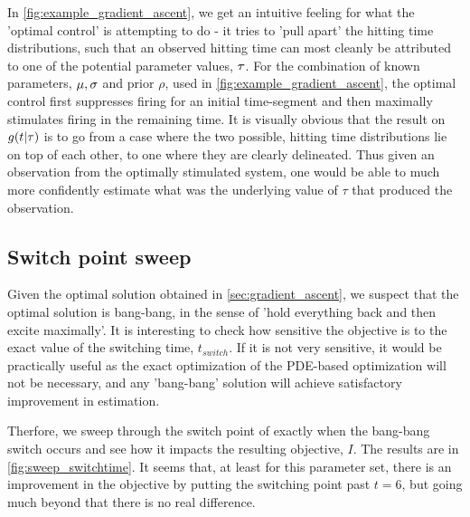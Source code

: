 In \cref{fig:example_gradient_ascent}, we get an intuitive 
feeling for what the 'optimal control' is attempting to do - it tries to
'pull apart' the hitting time distributions, such that an observed hitting time
can most cleanly be attributed to one of the potential parameter values, ${\tau}$.
For the combination of known parameters, ${\mu }, \sigma$ and prior $\rho$, used in
\cref{fig:example_gradient_ascent}, the optimal control first suppresses firing
for an initial time-segment and then maximally stimulates firing in the
remaining time. 
It is visually obvious that the result on $g(t|{ \tau })$ is to go
from a case where the two possible, hitting time distributions lie on top of each other, to one where they are clearly
delineated. Thus given an observation from the optimally stimulated system, one
would be able to much more confidently estimate what was the underlying value of
$\tau$ that produced the observation. 

\subsection{Switch point sweep}
Given the optimal solution obtained in \cref{sec:gradient_ascent}, we suspect
that the optimal solution is bang-bang, in the sense of 'hold  everything back
and then excite maximally'. It is interesting to check how sensitive the
objective is to the exact value of the switching time, $t_{switch}$. If it is
not very sensitive, it would be practically useful as the exact
optimization of the PDE-based optimization will not be
necessary, and any 'bang-bang' solution will achieve satisfactory improvement in
estimation. 

Therfore, we sweep through the switch point of exactly when the
bang-bang switch occurs and see how it impacts the resulting objective, $I$.
The results are in \cref{fig:sweep_switchtime}. It seems that, at least for this
parameter set, there is an improvement in the objective by putting the switching
point past $t=6$, but going much beyond that there is no real difference. 

